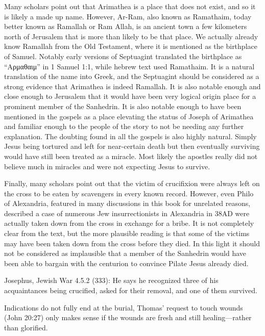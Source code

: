 Many scholars point out that Arimathea is a place that does not exist, and so it is likely a made up name.
However, Ar-Ram, also known as Ramathaim, today better known as Ramallah or Ram Allah, is an ancient town a few kilometers north of Jerusalem that is more than likely to be that place.
We actually already know Ramallah from the Old Testament, where it is mentioned as the birthplace of Samuel.
Notably early versions of Septuagint translated the birthplace as ``Αρμαθαιμ'' in 1 Samuel 1:1, while hebrew text used Ramathaim.
It is a natural translation of the name into Greek, and the Septuagint should be considered as a strong evidence that Arimathea is indeed Ramallah.
It is also notable enough and close enough to Jerusalem that it would have been very logical origin place for a prominent member of the Sanhedrin.
It is also notable enough to have been mentioned in the gospels as a place elevating the status of Joseph of Arimathea and familiar enough to the people of the story to not be needing any further explanation.
The doubting found in all the gospels is also highly natural.
Simply Jesus being tortured and left for near-certain death but then eventually surviving would have still been treated as a miracle.
Most likely the apostles really did not believe much in miracles and were not expecting Jesus to survive.

Finally, many scholars point out that the victim of crucifixion were always left on the cross to be eaten by scavengers in every known record.
However, even Philo of Alexandria, featured in many discussions in this book for unrelated reasons, described a case of numerous Jew insurrectionists in Alexandria in 38AD were actually taken down from the cross in exchange for a bribe.
It is not completely clear from the text, but the more plausible reading is that some of the victims may have been taken down from the cross before they died.
In this light it should not be considered as implausible that a member of the Sanhedrin would have been able to bargain with the centurion to convince Pilate Jesus already died.

Josephus, Jewish War 4.5.2 (333): He says he recognized three of his acquaintances being crucified, asked for their removal, and one of them survived.

Indications do not fully end at the burial, Thomas' request to touch wounds (John 20:27) only makes sense if the wounds are fresh and still healing---rather than glorified.

